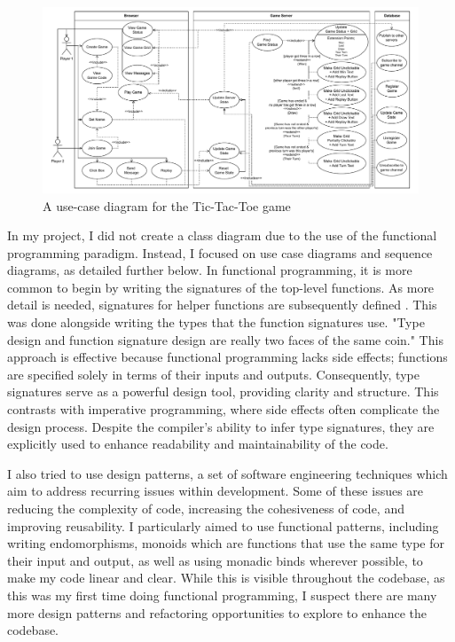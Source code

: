 \documentclass[]{final}
\begin{document}
\begin{figure}[ht!]
  \centering
  \includegraphics[width=\linewidth]{use_case}
  \vspace*{-0.5cm}
  \caption{A use-case diagram for the Tic-Tac-Toe game}
  \label{fig: 2}
\end{figure}


In my project, I did not create a class diagram due to the use of the functional
programming paradigm. Instead, I focused on use case diagrams and sequence diagrams,
as detailed further below. In functional programming, it is more common to begin
by writing the signatures of the top-level functions. As more detail is needed,
signatures for helper functions are subsequently defined \cite{Wlaschin_functional_2014}.
This was done alongside writing the types that the function signatures use. "Type design and function
signature design are really two faces of the same coin."\cite{noauthor_chapter_2024}
This approach is effective because functional programming lacks side effects; functions are
specified solely in terms of their inputs and outputs. Consequently,
type signatures serve as a powerful design tool, providing clarity and structure.
This contrasts with imperative programming, where side effects often complicate
the design process. Despite the compiler's ability to infer type signatures,
they are explicitly used to enhance readability and maintainability of the code.

I also tried to use design patterns, a set of software engineering
techniques which aim to address recurring issues within development. Some of these
issues are reducing the complexity of code, increasing the cohesiveness of code,
and improving reusability. I particularly aimed to use functional patterns, including
writing endomorphisms, monoids which are functions that use the same type for their
input and output\cite{Wlaschin_functional_2014}, as well as using monadic binds
wherever possible, to make my code linear and clear. While this is visible
throughout the codebase, as this was my first time doing functional programming,
I suspect there are many more design patterns and refactoring opportunities to explore
to enhance the codebase.
\end{document}
